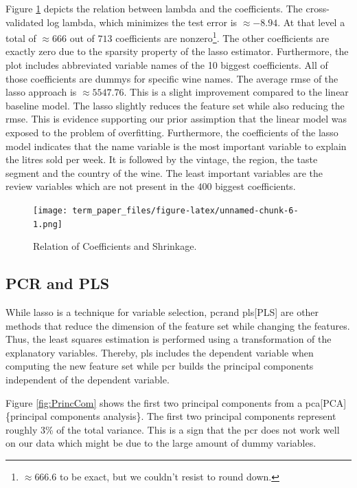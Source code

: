 \documentclass[11pt,]{article}
\let\rmarkdownfootnote\footnote%
\def\footnote{\protect\rmarkdownfootnote}
\begin{document}
Figure \ref{fig:CoefLamb} depicts the relation between lambda and the
coefficients. The cross-validated log lambda, which minimizes the test
error is \(\approx -8.94\). At that level a total of \(\approx 666\) out
of \(713\) coefficients are
nonzero\footnote{$\approx 666.6$ to be exact, but we couldn't resist to round down.}.
The other coefficients are exactly zero due to the sparsity property of
the \ac{lasso} estimator. Furthermore, the plot includes abbreviated
variable names of the 10 biggest coefficients. All of those coefficients
are dummys for specific wine names. The average \ac{rmse} of the
\ac{lasso} approach is \(\approx 5547.76\). This is a slight improvement
compared to the linear baseline model. The \ac{lasso} slightly reduces
the feature set while also reducing the \ac{rmse}. This is evidence
supporting our prior assimption that the linear model was exposed to the
problem of overfitting. Furthermore, the coefficients of the \ac{lasso}
model indicates that the name variable is the most important variable to
explain the litres sold per week. It is followed by the vintage, the
region, the taste segment and the country of the wine. The least
important variables are the review variables which are not present in
the \(400\) biggest coefficients.

\begin{figure}
\centering
\texttt{[image: term\_paper\_files/figure-latex/unnamed-chunk-6-1.png]}
\caption{\label{fig:CoefLamb}Relation of Coefficients and Shrinkage.}
\end{figure}

\hypertarget{pcr-and-pls}{%
\subsection{PCR and PLS}\label{pcr-and-pls}}

While \ac{lasso} is a technique for variable selection, \ac{pcr}and
\ac{pls}{[}PLS{]} are other methods that reduce the dimension of the
feature set while changing the features. Thus, the least squares
estimation is performed using a transformation of the explanatory
variables. Thereby, \ac{pls} includes the dependent variable when
computing the new feature set while \ac{pcr} builds the principal
components independent of the dependent variable.

Figure \ref{fig:PrincCom} shows the first two principal components from
a \ac{pca}{[}PCA{]}\{principal components analysis\}. The first two
principal components represent roughly 3\% of the total variance. This
is a sign that the \ac{pcr} does not work well on our data which might
be due to the large amount of dummy variables.
\end{document}
